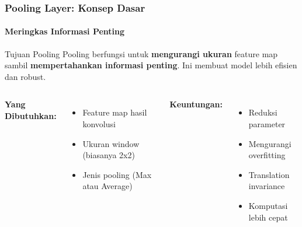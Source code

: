 \documentclass[t,aspectratio=169,xcolor=dvipsnames]{beamer}
\begin{document}
\begin{frame}
    \frametitle{Pooling Layer: Konsep Dasar}
    \framesubtitle{Meringkas Informasi Penting}
    \small

    \begin{block}{Tujuan Pooling}
        Pooling berfungsi untuk \textbf{mengurangi ukuran} feature map sambil \textbf{mempertahankan informasi penting}. Ini membuat model lebih efisien dan robust.
    \end{block}

    \begin{columns}[t]
        \textbf{Yang Dibutuhkan:}
        \begin{itemize}
            \item Feature map hasil konvolusi
            \item Ukuran window (biasanya 2x2)
            \item Jenis pooling (Max atau Average)
        \end{itemize}

        \textbf{Keuntungan:}
        \begin{itemize}
            \item Reduksi parameter
            \item Mengurangi overfitting
            \item Translation invariance
            \item Komputasi lebih cepat
        \end{itemize}
    \end{columns}

\end{frame}
\end{document}
